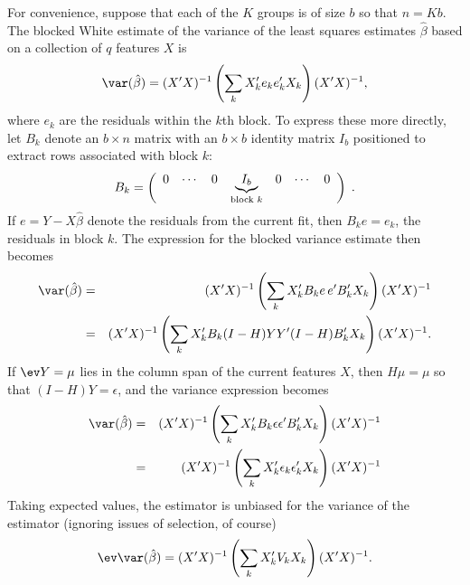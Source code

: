 \documentclass[12pt]{article}
\newcommand{\eps}{\epsilon}
\begin{document}
 For convenience, suppose that each of the $K$ groups is of size $b$ so that $n
 = K b$.  The blocked White estimate of the variance of the least squares
estimates $\hat\beta$ based on a collection of $q$ features $X$ is
\begin{equation}
  \var(\hat\beta) = (X'X)^{-1} \left(\sum_k X_k'e_ke_k'X_k\right) (X'X)^{-1},
\label{eq:blockwhite}
\end{equation}
 where $e_k$ are the residuals within the $k$th block.  To express these more
 directly, let $B_k$ denote an $b \times n$ matrix with an $b\times b$ identity
 matrix $I_b$ positioned to extract rows associated with block $k$:
\begin{equation}
  B_k = \left(
   \begin{array}{ccccccc}
     0  & \cdots & 0 & \underbrace{I_b}_{\mbox{\scriptsize block $k$}} & 0 & \cdots & 0 
   \end{array}
   \right) \;.
\label{eq:Bk}
\end{equation}
 If $e = Y - X \hat\beta$ denote the residuals from the current fit, then $B_ke
 = e_k$, the residuals in block $k$.  The expression for the blocked variance
estimate  then becomes
\begin{eqnarray}
  \var(\hat\beta) 
  &=& (X'X)^{-1} \left(\sum_k X_k' B_k e \, e' B_k' X_k\right) (X'X)^{-1} \cr
  &=& (X'X)^{-1} \left(\sum_k X_k' B_k (I-H)YY'(I-H) B_k' X_k\right)(X'X)^{-1}.
\label{eq:blockwhite1}
\end{eqnarray}
 If $\ev Y = \mu$ lies in the column span of the current features $X$, then $H
 \mu = \mu$ so that $(I - H)Y = \epsilon$, and the variance expression becomes
\begin{eqnarray}
  \var(\hat\beta) 
  &=& (X'X)^{-1} \left(\sum_k X_k' B_k \eps \eps' B_k' X_k\right)(X'X)^{-1}\cr
  &=& (X'X)^{-1} \left(\sum_k X_k' \eps_k \eps_k' X_k\right)(X'X)^{-1}
\label{eq:blockwhite2}
\end{eqnarray}
 Taking expected values, the estimator is unbiased for the variance of the
 estimator (ignoring issues of selection, of course)
\begin{equation}
  \ev \var(\hat\beta) 
  = (X'X)^{-1} \left(\sum_k X_k' V_k X_k\right)(X'X)^{-1}.
\label{eq:blockwhite3}
\end{equation}
\end{document}
